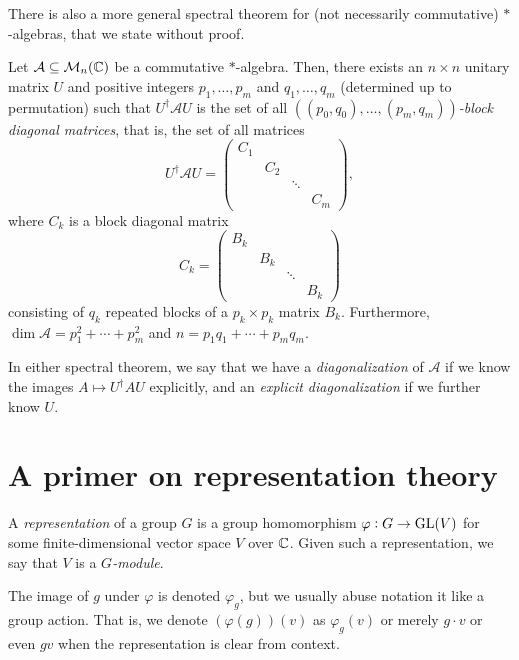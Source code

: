 	There is also a more general spectral theorem for (not necessarily commutative) $*$-algebras, that we state without proof.

	\begin{ftheo}
		\label{theo:noncomm-spec-thm}
		Let $\mathcal{A} \subseteq \mathcal{M}_n(\mathbb{C})$ be a commutative $*$-algebra. Then, there exists an $n \times n$ unitary matrix $U$ and positive integers $p_1,\ldots,p_m$ and $q_1,\ldots,q_m$ (determined up to permutation) such that $U^\dagger \mathcal{A} U$ is the set of all \emph{$((p_0,q_0),\ldots,(p_m,q_m))$-block diagonal matrices}, that is, the set of all matrices
		\[ U^\dagger \mathcal{A} U = \begin{pmatrix} C_1 & & & \\ & C_2 & & \\ & & \ddots & \\ & & & C_m \end{pmatrix}, \]
		where $C_k$ is a block diagonal matrix
		\[ C_k = \begin{pmatrix} B_k & & & \\ & B_k & & \\ & & \ddots & \\ & & & B_k \end{pmatrix} \]
		consisting of $q_k$ repeated blocks of a $p_k \times p_k$ matrix $B_k$.	
		Furthermore, $\dim \mathcal{A} = p_1^2 + \cdots + p_m^2$ and $n = p_1q_1 + \cdots + p_mq_m$.
	\end{ftheo}

	In either spectral theorem, we say that we have a \emph{diagonalization} of $\mathcal{A}$ if we know the images $A \mapsto U^\dagger A U$ explicitly, and an \emph{explicit diagonalization} if we further know $U$.

\clearpage
\section{A primer on representation theory}

	\begin{fdef}
		A \emph{representation} of a group $G$ is a group homomorphism $\varphi : G \to \operatorname{GL}(V)$ for some finite-dimensional vector space $V$ over $\mathbb{C}$. Given such a representation, we say that $V$ is a \emph{$G$-module}.
	\end{fdef}
	The image of $g$ under $\varphi$ is denoted $\varphi_g$, but we usually abuse notation it like a group action. That is, we denote $(\varphi(g))(v)$ as $\varphi_g(v)$ or merely $g \cdot v$ or even $gv$ when the representation is clear from context.

